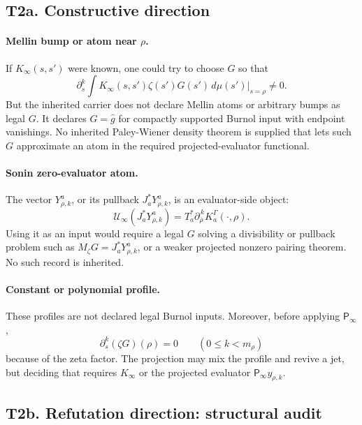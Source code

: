 \documentclass[11pt]{article}
\newcommand{\Psym}{\mathsf P_\infty}
\newcommand{\Uinf}{\mathcal U_\infty}
\begin{document}
\subsection*{T2a. Constructive direction}

\paragraph{Mellin bump or atom near \(\rho\).}
If \(K_\infty(s,s')\) were known, one could try to choose \(G\) so that
\[
  \partial_s^k
  \int K_\infty(s,s')\zeta(s')G(s')\,d\mu(s')
  \bigg|_{s=\rho}
  \ne0.
\]
But the inherited carrier does not declare Mellin atoms or arbitrary bumps as
legal \(G\). It declares \(G=\widehat g\) for compactly supported Burnol input
with endpoint vanishings. No inherited Paley-Wiener density theorem is supplied
that lets such \(G\) approximate an atom in the required projected-evaluator
functional.

\paragraph{Sonin zero-evaluator atom.}
The vector \(Y^a_{\rho,k}\), or its pullback \(J_a^*Y^a_{\rho,k}\), is an
evaluator-side object:
\[
  \Uinf(J_a^*Y^a_{\rho,k})
  =
  T_a^*\partial_{\overline \rho}^{\,k}K_a^\Gamma(\cdot,\rho).
\]
Using it as an input would require a legal \(G\) solving a divisibility or
pullback problem such as \(M_\zeta G=J_a^*Y^a_{\rho,k}\), or a weaker projected
nonzero pairing theorem. No such record is inherited.

\paragraph{Constant or polynomial profile.}
These profiles are not declared legal Burnol inputs. Moreover, before applying
\(\Psym\),
\[
  \partial_s^k(\zeta G)(\rho)=0
  \qquad(0\le k<m_\rho)
\]
because of the zeta factor. The projection may mix the profile and revive a
jet, but deciding that requires \(K_\infty\) or the projected evaluator
\(\Psym y_{\rho,k}\).

\subsection*{T2b. Refutation direction: structural audit}
\end{document}

